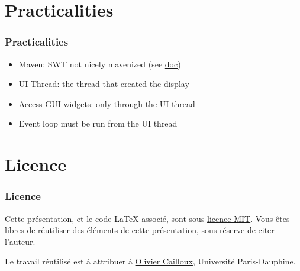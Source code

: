 \documentclass[french, english]{beamer}
\begin{document}
\section{Practicalities}
\begin{frame}
	\frametitle{Practicalities}
	\begin{itemize}
		\item Maven: SWT not nicely mavenized (see \href{https://github.com/oliviercailloux/java-course/blob/master/SWT.adoc}{doc})
		\item UI Thread: the thread that created the display
		\item Access GUI widgets: only through the UI thread
		\item Event loop must be run from the UI thread
	\end{itemize}
\end{frame}

\appendix

\section{Licence}
\clearpage{}
\begin{frame}[plain]
	\frametitle{Licence}
	Cette présentation, et le code LaTeX associé, sont sous \href{http://opensource.org/licenses/MIT}{licence MIT}. Vous êtes libres de réutiliser des éléments de cette présentation, sous réserve de citer l’auteur.
	
	Le travail réutilisé est à attribuer à \href{http://www.lamsade.dauphine.fr/~ocailloux/}{Olivier Cailloux}, Université Paris-Dauphine.
\end{frame}
\addtocounter{framenumber}{-1}
\end{document}
